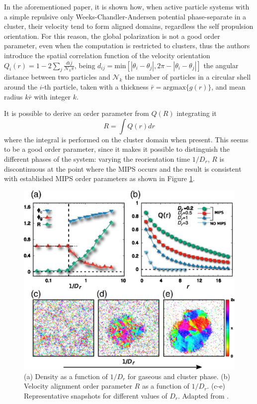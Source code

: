 \documentclass[../../master_thesis_np.tex]{subfiles}
\begin{document}
	In the aforementioned paper, it is shown how, when active particle systems with a simple repulsive only Weeks-Chandler-Andersen potential phase-separate in a cluster, their velocity tend to form aligned domains, regardless the self propulsion orientation. 
	For this reason, the global polarization is not a good order parameter, even when the computation is restricted to clusters, thus the authors introduce the spatial correlation function of the velocity orientation $Q_i(r) = 1-2\sum_{j} \frac{d{ij}}{\mathcal{N}_k \pi } $, being $d_{ij} = \mathrm{min}\left[|\theta_i - \theta_j|, 2 \pi - |\theta_i - \theta_j| \right]$ the angular distance between two particles and $\mathcal{N}_k$ the number of particles in a circular shell around the $i$-th particle, taken with a thickness $\bar{r} = \mathrm{argmax} \{g(r)\}$, and mean radius $k\bar{r}$ with integer $k$. 
	
	It is possible to derive an order parameter from $Q(R)$ integrating it
	\begin{equation} 
	R = \int Q(r) dr 
	\end{equation}
	where the integral is performed on the cluster domain when present. 
	This seems to be a good order parameter, since it makes it possible to distinguish the different phases of the system: varying the reorientation time $1/D_r$, $R$ is discontinuous at the point where the MIPS occurs and the result is consistent with established MIPS order parameters as shown in Figure \ref{fig:caprini1}. 
	
	\begin{figure}[htp]
		\centering
		\includegraphics[width=\singfigwidth]{caprini2.png}
		\caption{(a) Density as a function of $1/D_r$ for gaseous and cluster phase. (b) Velocity alignment order parameter $R$ as a function of $1/D_r$. (c-e) Representative snapshots for different values of $D_r$. Adapted from \cite{caprini_spontaneous_2020}.}
		\label{fig:caprini1}
	\end{figure}
	
\end{document}
